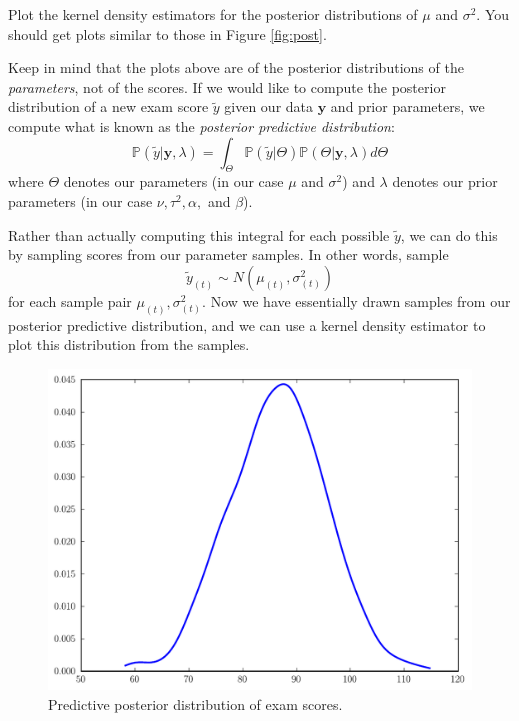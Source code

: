 \begin{problem}
Plot the kernel density estimators for the posterior distributions of $\mu$ and $\sigma^{2}$.
You should get plots similar to those in Figure \ref{fig:post}.
\end{problem}

Keep in mind that the plots above are of the posterior distributions of the \emph{parameters}, not of the scores. If we would like to compute the posterior distribution of a new exam score $\tilde{y}$ given our data $\mathbf{y}$ and prior parameters, we compute what is known as the \emph{posterior predictive distribution}:
\begin{equation*}
\mathbb{P}(\tilde{y} | \mathbf{y}, \lambda) = \int_{\Theta} \mathbb{P}(\tilde{y} | \Theta)\mathbb{P}(\Theta | \mathbf{y}, \lambda) d\Theta
\end{equation*}
where $\Theta$ denotes our parameters (in our case $\mu$ and $\sigma^{2}$) and $\lambda$ denotes our prior parameters (in our case $\nu, \tau^{2}, \alpha,$ and $\beta$).

Rather than actually computing this integral for each possible $\tilde{y}$, we can do this by sampling scores from our parameter samples. In other words, sample
\begin{equation*}
\tilde{y}_{(t)} \sim N(\mu_{(t)}, \sigma_{(t)}^{2})
\end{equation*}
for each sample pair $\mu_{(t)}, \sigma_{(t)}^{2}$. Now we have essentially drawn samples from our posterior predictive distribution, and we can use a kernel density estimator to plot this distribution from the samples.

\begin{figure}
\includegraphics[width=\textwidth]{predictiveposterior.pdf}
\caption{Predictive posterior distribution of exam scores.}
\label{fig:predictive}
\end{figure}

